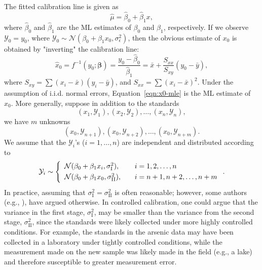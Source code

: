 \documentclass[cmfont,usenames,dvipsnames,leqno]{afit-etd}\usepackage[]{graphicx}\usepackage[]{color}
\newcommand{\mc}[1]{\ensuremath{\mathcal{#1}}}
\newcommand{\wh}[1]{\ensuremath{\widehat{#1}}}
\begin{document}
The fitted calibration line is given as
\begin{equation}
\label{eqn:fitted-slr-model}
  \wh{\mu} = \wh{\beta}_0 + \wh{\beta}_1 x,
\end{equation}
where $\wh{\beta}_0$ and $\wh{\beta}_1$ are the \ac{ML} estimates of $\beta_0$ and $\beta_1$, respectively. If we observe $\mc{Y}_0 = y_0$, where $\mc{Y}_0 \sim \mc{N}(\beta_0 + \beta_1 x_0, \sigma_\epsilon^2)$, then the obvious estimate of $x_0$ is obtained by "inverting" the calibration line:
\begin{equation}
\label{eqn:x0-mle}
  \wh{x}_0 = {f}^{-1}(y_0; \bm{\beta}) = \frac{y_0 - \wh{\beta}_0}{\wh{\beta}_1} = \bar{x} + \frac{S_{xx}}{S_{xy}}(y_0 - \bar{y}),
\end{equation}
where $S_{xy} = \sum(x_i-\bar{x})(y_i-\bar{y})$, and $S_{xx} = \sum(x_i-\bar{x})^2$. Under the assumption of i.i.d. normal errors, Equation~\eqref{eqn:x0-mle} is the \ac{ML} estimate of $x_0$. More generally, suppose in addition to the standards 
\begin{equation*}
  (x_1, \mc{Y}_1), (x_2, \mc{Y}_2), \dotsc, (x_n, \mc{Y}_n),
\end{equation*}
we have $m$ unknowns
\begin{equation*}
  (x_0, \mc{Y}_{n+1}), (x_0, \mc{Y}_{n+2}), \dotsc, (x_0, \mc{Y}_{n+m}).
\end{equation*}
We assume that the $\mc{Y}_i$'s ($i = 1, \dotsc, n$) are independent and distributed according to
\begin{equation*}
  \mc{Y}_i \sim \left\{
  \begin{array}{l l}
    \mc{N}(\beta_0+\beta_1 x_i, \sigma_{\text{I}}^2), & \quad i=1,2,\dotsc,n \smallskip \\
    \mc{N}(\beta_0+\beta_1 x_0, \sigma_{\text{II}}^2), & \quad i=n+1,n+2,\dotsc,n+m
  \end{array} \right..
\end{equation*}
In practice, assuming that $\sigma_{\text{I}}^2 = \sigma_{\text{II}}^2$ is often reasonable; however, some authors (e.g., \citet[p. 659]{berkson_estimation_1969}), have argued otherwise. In controlled calibration, one could argue that the variance in the first stage, $\sigma_{\text{I}}^2$, may be smaller than the variance from the second stage, $\sigma_{\text{II}}^2$, since the standards were likely collected under more highly controlled conditions. For example, the standards in the arsenic data may have been collected in a laboratory under tightly controlled conditions, while the measurement made on the new sample was likely made in the field (e.g., a lake) and therefore susceptible to greater measurement error. 
\end{document}
